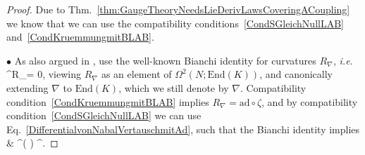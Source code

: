 \documentclass[preprint]{elsarticle}
\def\bas#1\eas{\begin{align*}#1\end{align*}}
\theoremstyle{plain}
\theoremstyle{remark}
\theoremstyle{definition}
\begin{document}
\begin{proof}
\leavevmode\newline
Due to Thm.~\ref{thm:GaugeTheoryNeedsLieDerivLawsCoveringACoupling} we know that we can use the compatibility conditions~\eqref{CondSGleichNullLAB} and~\eqref{CondKruemmungmitBLAB}.

$\bullet$ As also argued in \cite[\S 7.2, Lemma 7.2.4, $\zeta$ is denoted as $\Lambda$ there; page 273]{mackenzieGeneralTheory}, use the well-known Bianchi identity for curvatures $R_\nabla$, \textit{i.e.}
\bas
\mathrm{d}^\nabla R_\nabla = 0,
\eas
viewing $R_\nabla$ as an element of $\Omega^2(N; \mathrm{End}(K))$, and canonically extending $\nabla$ to $\mathrm{End}(K)$, which we still denote by $\nabla$. Compatibility condition~\eqref{CondKruemmungmitBLAB} implies $R_\nabla = \mathrm{ad} \circ \zeta$, and by compatibility condition~\eqref{CondSGleichNullLAB} we can use Eq.~\eqref{DifferentialvonNabalVertauschmitAd}, such that the Bianchi identity implies
\bas
0
&
^\nabla\mleft(  \circ \zeta \mright)
 \circ {}^\nabla \zeta.
\eas


\end{proof}
\end{document}
